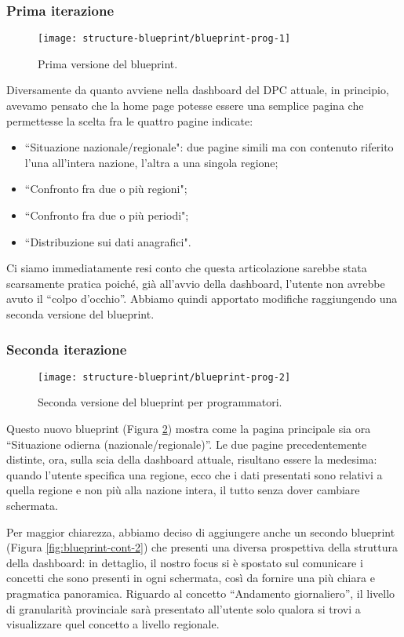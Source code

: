 \subsubsection{Prima iterazione}
\begin{figure}[H]
    \centering
    \texttt{[image: structure-blueprint/blueprint-prog-1]}
    \caption{Prima versione del blueprint.}\label{fig:blueprint-prog-1}
\end{figure}
Diversamente da quanto avviene nella dashboard del DPC attuale, in principio, avevamo pensato che la home page potesse essere una semplice pagina che permettesse la scelta fra le quattro pagine indicate:
\begin{itemize}
    \item ``Situazione nazionale/regionale": due pagine simili ma con contenuto riferito l'una all'intera nazione, l'altra a una singola regione;
    \item ``Confronto fra due o più regioni";
    \item ``Confronto fra due o più periodi";
    \item ``Distribuzione sui dati anagrafici".
\end{itemize}
Ci siamo immediatamente resi conto che questa articolazione sarebbe stata scarsamente pratica poiché, già all'avvio della dashboard, l'utente non avrebbe avuto il ``colpo d'occhio''. Abbiamo quindi apportato modifiche raggiungendo una seconda versione del blueprint.

\subsubsection{Seconda iterazione}\label{ss:seconda-iterazione}
\begin{figure}[H]
    \centering
    \texttt{[image: structure-blueprint/blueprint-prog-2]}
    \caption{Seconda versione del blueprint per programmatori.}\label{fig:blueprint-prog-2}
\end{figure}
Questo nuovo blueprint (Figura \ref{fig:blueprint-prog-2}) mostra come la pagina principale sia ora ``Situazione odierna (nazionale/regionale)''. Le due pagine precedentemente distinte, ora, sulla scia della dashboard attuale, risultano essere la medesima: quando l'utente specifica una regione, ecco che i dati presentati sono relativi a quella regione e non più alla nazione intera, il tutto senza dover cambiare schermata.
\clearpage

Per maggior chiarezza, abbiamo deciso di aggiungere anche un secondo blueprint (Figura \ref{fig:blueprint-cont-2}) che presenti una diversa prospettiva della struttura della dashboard: in dettaglio, il nostro focus si è spostato sul comunicare i concetti che sono presenti in ogni schermata, così da fornire una più chiara e pragmatica panoramica.
Riguardo al concetto ``Andamento giornaliero'', il livello di granularità provinciale sarà presentato all'utente solo qualora si trovi a visualizzare quel concetto a livello regionale.

